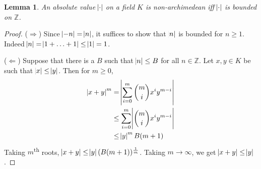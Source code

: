 \documentclass[11pt]{article}
\theoremstyle{definition}
\theoremstyle{plain}
\newtheorem{lemma}[definition]{Lemma}
\theoremstyle{remark}
\newcommand{\ZZ}{\mathbb{Z}}
\begin{document}
\begin{lemma}\label{lem:7_9}
    An absolute value $\abs{\cdot}$ on a field $K$ is non-archimedean iff $\abs{\cdot}$ is bounded on $\ZZ$.
\end{lemma}
\begin{proof}
    ($\Rightarrow$) Since $\abs{-n} = \abs{n}$, it suffices to show that $\abs{n}$ is bounded for $n \ge 1$. Indeed $\abs{n} = \abs{1 + \ldots + 1} \le \abs{1} = 1$.

    \noindent ($\Leftarrow$) Suppose that there is a $B$ such that $\abs{n} \le B$ for all $n \in \ZZ$. Let $x, y \in K$ be such that $\abs{x} \le \abs{y}$. Then for $m \ge 0$,
    \begin{align*}
        \abs{x + y}^m
        &= \abs{\sum_{i=0}^m \binom{m}{i} x^i y^{m-i}}\\
        &\le \sum_{i=0}^m \abs{\binom{m}{i} x^i y^{m-i}}\\
        &\le \abs{y}^m B (m+1)
    \end{align*}
    Taking $m$\textsuperscript{th} roots, $\abs{x + y} \le \abs{y} (B (m + 1))^\frac{1}{m}$. Taking $m \to \infty$, we get $\abs{x + y} \le \abs{y}$.
\end{proof}
\end{document}
